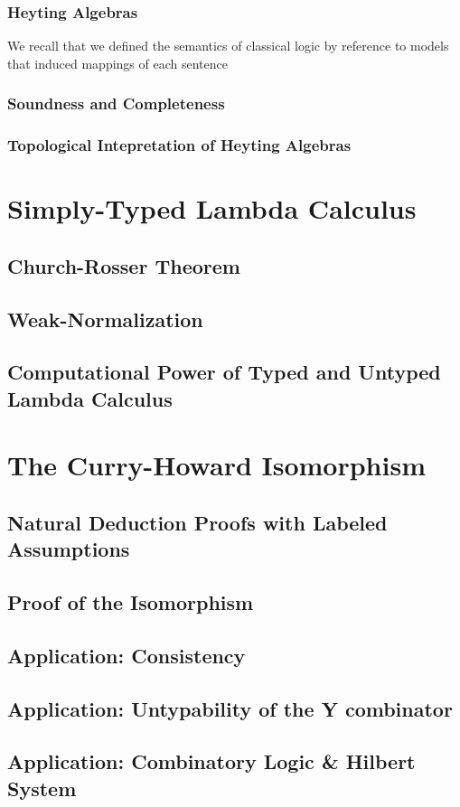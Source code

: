 \documentclass[12pt]{article}
\begin{document}
\subsubsection{Heyting Algebras}
We recall that we defined the semantics of classical logic by reference to models that induced mappings of each sentence 

\subsubsection{Soundness and Completeness}
\subsubsection{Topological Intepretation of Heyting Algebras}
\section{Simply-Typed Lambda Calculus}
\subsection{Church-Rosser Theorem} 
\subsection{Weak-Normalization}
\subsection{Computational Power of Typed and Untyped Lambda Calculus}
\section{The Curry-Howard Isomorphism}
\subsection{Natural Deduction Proofs with Labeled Assumptions}
\subsection{Proof of the Isomorphism}
\subsection{Application: Consistency}
\subsection{Application: Untypability of the Y combinator}
\subsection{Application: Combinatory Logic \& Hilbert System}
\end{document}
